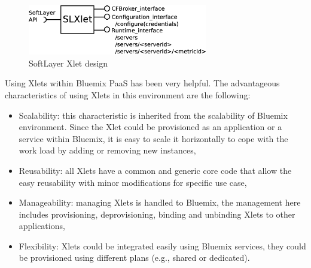 \begin{figure}[H]
\centering
\hspace{1.5cm}
\includegraphics[width=0.7\textwidth]{pics/SLXlet}
\caption{\label{fig:slxlet} SoftLayer Xlet design}
\end{figure}

Using Xlets within Bluemix PaaS has been very helpful. The advantageous characteristics of using Xlets in this environment are the following:
\begin{itemize}
 \item Scalability: this characteristic is inherited from the scalability of Bluemix environment. Since the Xlet could be provisioned as an application or a service within 
Bluemix, it is easy to scale it horizontally to cope with the work load by adding or removing new instances,
\item Reusability: all Xlets have a common and generic core code that allow the easy reusability with minor modifications for specific use case, 
\item Manageability: managing Xlets is handled to Bluemix, the management here includes provisioning, deprovisioning, binding and unbinding Xlets to other applications,
\item Flexibility: Xlets could be integrated easily using Bluemix services, they could be provisioned using different plans (e.g., shared or dedicated). 
\end{itemize}